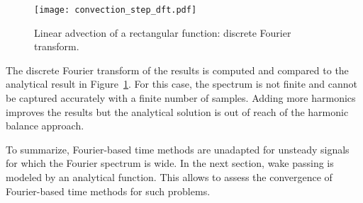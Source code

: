 \begin{figure}[htp]
  \centering
  \texttt{[image: convection\_step\_dft.pdf]}
  \caption{Linear advection of a rectangular function: 
  discrete Fourier transform.}
  \label{fig:dft_step}
\end{figure}
The discrete Fourier transform of the results
is computed and compared to the analytical result in Figure~\ref{fig:dft_step}.
For this case, the spectrum is not finite and cannot be captured accurately
with a finite number of samples.
Adding more harmonics improves the results but the analytical
solution is out of reach of the harmonic
balance approach. 

To summarize, Fourier-based time methods are unadapted
for unsteady signals for which the Fourier spectrum is wide.
In the next section, wake passing is modeled by an analytical
function. This allows to assess the convergence of Fourier-based time
methods for such problems.
